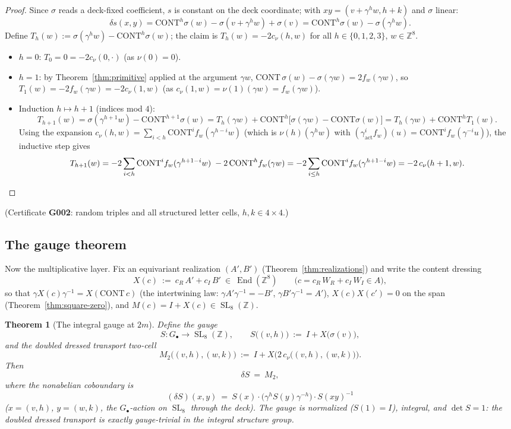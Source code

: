 \documentclass[11pt]{article}
\newcommand{\Z}{\mathbb Z}
\newcommand{\SL}{\operatorname{SL}}
\newcommand{\End}{\operatorname{End}}
\newtheorem{theorem}{Theorem}[section]
\begin{document}
\begin{proof}
Since $\sigma$ reads a deck-fixed coefficient, $s$ is constant on the
deck coordinate; with $xy=(v+\gamma^hw,h+k)$ and $\sigma$ linear:
\[
\delta s(x,y)=\mathrm{CONT}^h\sigma(w)-\sigma(v+\gamma^hw)+\sigma(v)
=\mathrm{CONT}^h\sigma(w)-\sigma(\gamma^hw).
\]
Define $T_h(w):=\sigma(\gamma^hw)-\mathrm{CONT}^h\sigma(w)$; the claim
is $T_h(w)=-2c_\nu(h,w)$ for all $h\in\{0,1,2,3\}$, $w\in\Z^8$.
\begin{itemize}
\item $h=0$: $T_0=0=-2c_\nu(0,\cdot)$ (as $\nu(0)=0$).
\item $h=1$: by Theorem~\ref{thm:primitive} applied at the argument
$\gamma w$,
$\mathrm{CONT}\,\sigma(w)-\sigma(\gamma w)=2f_w(\gamma w)$, so
$T_1(w)=-2f_w(\gamma w)=-2c_\nu(1,w)$ (as
$c_\nu(1,w)=\nu(1)(\gamma w)=f_w(\gamma w)$).
\item Induction $h\mapsto h+1$ (indices mod $4$):
\[
T_{h+1}(w)=\sigma(\gamma^{h+1}w)-\mathrm{CONT}^{h+1}\sigma(w)
=T_h(\gamma w)+\mathrm{CONT}^h\bigl[\sigma(\gamma w)-\mathrm{CONT}\sigma(w)\bigr]
=T_h(\gamma w)+\mathrm{CONT}^hT_1(w).
\]
Using the expansion
$c_\nu(h,w)=\sum_{i<h}\mathrm{CONT}^i f_w(\gamma^{h-i}w)$ (which is
$\nu(h)(\gamma^hw)$ with
$(\gamma_{\mathrm{act}}^if_w)(u)=\mathrm{CONT}^if_w(\gamma^{-i}u)$),
the inductive step gives
\[
T_{h+1}(w)=-2\sum_{i<h}\mathrm{CONT}^if_w(\gamma^{h+1-i}w)
\;-2\,\mathrm{CONT}^hf_w(\gamma w)
=-2\sum_{i\le h}\mathrm{CONT}^if_w(\gamma^{h+1-i}w)
=-2\,c_\nu(h+1,w).\qedhere
\]
\end{itemize}
\end{proof}

(Certificate \textbf{G002}: random triples and all structured letter
cells, $h,k\in4\times4$.)

\subsection{The gauge theorem}

Now the multiplicative layer. Fix an equivariant realization
$(A',B')$ (Theorem~\ref{thm:realizations}) and write the content
dressing
\[
X(c)\ :=\ c_R\,A'+c_I\,B'\ \in\ \End(\Z^8)\qquad
\bigl(c=c_R\,W_R+c_I\,W_I\in A\bigr),
\]
so that $\gamma X(c)\gamma^{-1}=X(\mathrm{CONT}\,c)$ (the
intertwining law: $\gamma A'\gamma^{-1}=-B'$,
$\gamma B'\gamma^{-1}=A'$), $X(c)X(c')=0$ on the span
(Theorem~\ref{thm:square-zero}), and $M(c)=I+X(c)\in\SL_8(\Z)$.

\begin{theorem}[The integral gauge at $2m$]\label{thm:gauge}
Define the gauge
\[
S\colon G_\bullet\to\SL_8(\Z),\qquad
S\bigl((v,h)\bigr)\ :=\ I+X\bigl(\sigma(v)\bigr),
\]
and the doubled dressed transport two-cell
\[
M_2\bigl((v,h),(w,k)\bigr)\ :=\ I+X\bigl(2\,c_\nu\bigl((v,h),(w,k)\bigr)\bigr).
\]
Then
\[
\delta S\ =\ M_2,
\]
where the nonabelian coboundary is
\[
(\delta S)(x,y)\ =\ S(x)\cdot\bigl(\gamma^hS(y)\gamma^{-h}\bigr)\cdot
S(xy)^{-1}
\]
($x=(v,h)$, $y=(w,k)$, the $G_\bullet$-action on $\SL_8$ through the
deck). The gauge is normalized ($S(1)=I$), integral, and
$\det S=1$: the doubled dressed transport is \emph{exactly}
gauge-trivial in the integral structure group.
\end{theorem}
\end{document}
